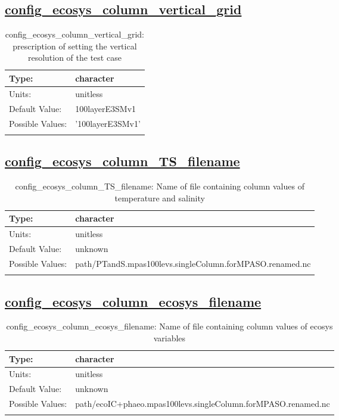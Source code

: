 \subsection[config\_ecosys\_column\_vertical\_grid]{\hyperref[sec:nm_tab_ecosys_column]{config\_ecosys\_column\_vertical\_grid}}
\label{subsec:nm_sec_config_ecosys_column_vertical_grid}
\begin{center}
\begin{longtable}{| p{2.0in} || p{4.0in} |}
    \hline
    Type: & character \\
    \hline
    Units: & \si{unitless} \\
    \hline
    Default Value: & 100layerE3SMv1 \\
    \hline
    Possible Values: & '100layerE3SMv1' \\
    \hline
    \caption{config\_ecosys\_column\_vertical\_grid: prescription of setting the vertical resolution of the test case}
\end{longtable}
\end{center}
\subsection[config\_ecosys\_column\_TS\_filename]{\hyperref[sec:nm_tab_ecosys_column]{config\_ecosys\_column\_TS\_filename}}
\label{subsec:nm_sec_config_ecosys_column_TS_filename}
\begin{center}
\begin{longtable}{| p{2.0in} || p{4.0in} |}
    \hline
    Type: & character \\
    \hline
    Units: & \si{unitless} \\
    \hline
    Default Value: & unknown \\
    \hline
    Possible Values: & path/PTandS.mpas100levs.singleColumn.forMPASO.renamed.nc \\
    \hline
    \caption{config\_ecosys\_column\_TS\_filename: Name of file containing column values of temperature and salinity}
\end{longtable}
\end{center}
\subsection[config\_ecosys\_column\_ecosys\_filename]{\hyperref[sec:nm_tab_ecosys_column]{config\_ecosys\_column\_ecosys\_filename}}
\label{subsec:nm_sec_config_ecosys_column_ecosys_filename}
\begin{center}
\begin{longtable}{| p{2.0in} || p{4.0in} |}
    \hline
    Type: & character \\
    \hline
    Units: & \si{unitless} \\
    \hline
    Default Value: & unknown \\
    \hline
    Possible Values: & path/ecoIC+phaeo.mpas100levs.singleColumn.forMPASO.renamed.nc \\
    \hline
    \caption{config\_ecosys\_column\_ecosys\_filename: Name of file containing column values of ecosys variables}
\end{longtable}
\end{center}
